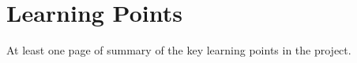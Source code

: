 \chapter{Learning Points}
\label{ch:learning-points}

At least one page of summary of the key learning points in the project.
